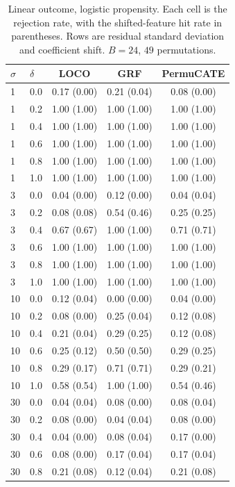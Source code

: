 \begin{table}[p]
\centering
\small
\caption{Linear outcome, logistic propensity.
Each cell is the rejection rate, with the shifted-feature hit rate in
parentheses.
Rows are residual standard deviation and coefficient shift.
\(B=24\), \(49\) permutations.}
\label{tab:lm-logistic}
\begin{tabular}{llccc}
\toprule
\(\sigma\) & \(\delta\) & LOCO & GRF & PermuCATE \\
\midrule
1 & 0.0 & 0.17 (0.00) & 0.21 (0.04) & 0.08 (0.00) \\
1 & 0.2 & 1.00 (1.00) & 1.00 (1.00) & 1.00 (1.00) \\
1 & 0.4 & 1.00 (1.00) & 1.00 (1.00) & 1.00 (1.00) \\
1 & 0.6 & 1.00 (1.00) & 1.00 (1.00) & 1.00 (1.00) \\
1 & 0.8 & 1.00 (1.00) & 1.00 (1.00) & 1.00 (1.00) \\
1 & 1.0 & 1.00 (1.00) & 1.00 (1.00) & 1.00 (1.00) \\
\midrule
3 & 0.0 & 0.04 (0.00) & 0.12 (0.00) & 0.04 (0.04) \\
3 & 0.2 & 0.08 (0.08) & 0.54 (0.46) & 0.25 (0.25) \\
3 & 0.4 & 0.67 (0.67) & 1.00 (1.00) & 0.71 (0.71) \\
3 & 0.6 & 1.00 (1.00) & 1.00 (1.00) & 1.00 (1.00) \\
3 & 0.8 & 1.00 (1.00) & 1.00 (1.00) & 1.00 (1.00) \\
3 & 1.0 & 1.00 (1.00) & 1.00 (1.00) & 1.00 (1.00) \\
\midrule
10 & 0.0 & 0.12 (0.04) & 0.00 (0.00) & 0.04 (0.00) \\
10 & 0.2 & 0.08 (0.00) & 0.25 (0.04) & 0.12 (0.08) \\
10 & 0.4 & 0.21 (0.04) & 0.29 (0.25) & 0.12 (0.08) \\
10 & 0.6 & 0.25 (0.12) & 0.50 (0.50) & 0.29 (0.25) \\
10 & 0.8 & 0.29 (0.17) & 0.71 (0.71) & 0.29 (0.21) \\
10 & 1.0 & 0.58 (0.54) & 1.00 (1.00) & 0.54 (0.46) \\
\midrule
30 & 0.0 & 0.04 (0.04) & 0.08 (0.00) & 0.08 (0.04) \\
30 & 0.2 & 0.08 (0.00) & 0.04 (0.04) & 0.08 (0.00) \\
30 & 0.4 & 0.04 (0.00) & 0.08 (0.04) & 0.17 (0.00) \\
30 & 0.6 & 0.08 (0.00) & 0.17 (0.04) & 0.17 (0.04) \\
30 & 0.8 & 0.21 (0.08) & 0.12 (0.04) & 0.21 (0.08) \\

\end{tabular}
\end{table}
